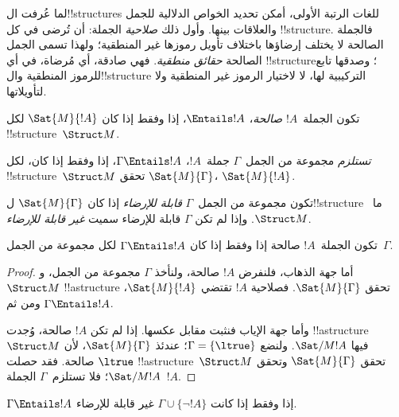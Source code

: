 \documentclass[../../../include/open-logic-section]{subfiles}
\begin{document}

\begin{explain}
لما عُرفت ال!!{structure}s للغات الرتبة الأولى، أمكن تحديد
الخواص الدلالية للجمل والعلاقات بينها. وأول ذلك \emph{صلاحية}
الجملة: أن تُرضى في كل !!{structure}. فالجملة الصالحة لا يختلف
إرضاؤها باختلاف تأويل رموزها غير المنطقية؛ ولهذا تسمى الجمل
الصالحة \emph{حقائق منطقية}. فهي صادقة، أي مُرضاة، في أي
!!{structure}؛ وصدقها تابع للرموز المنطقية وال!!{structure}
التركيبية لها، لا لاختيار الرموز غير المنطقية ولا لتأويلاتها.
\end{explain}

\begin{defn}[الصلاحية]
تكون الجملة~$!A$ \emph{صالحة}، $\Entails !A$، إذا وفقط إذا كان
$\Sat{M}{!A}$ لكل !!{structure}~$\Struct M$.
\end{defn}

\begin{defn}[الاستلزام]
\emph{تستلزم} مجموعة من الجمل~$\Gamma$ جملة~$!A$،
$\Gamma \Entails !A$، إذا وفقط إذا كان، لكل
!!{structure}~$\Struct M$ تحقق $\Sat{M}{\Gamma}$،
$\Sat{M}{!A}$.
\end{defn}


\begin{defn}
تكون مجموعة من الجمل~$\Gamma$ \emph{قابلة للإرضاء} إذا كان
$\Sat{M}{\Gamma}$ ل!!{structure} ما~$\Struct M$. وإذا لم تكن
$\Gamma$ قابلة للإرضاء سميت \emph{غير قابلة للإرضاء}.
\end{defn}

\begin{prop}
تكون الجملة~$!A$ صالحة إذا وفقط إذا كان
$\Gamma \Entails !A$ لكل مجموعة من الجمل~$\Gamma$.
\end{prop}

\begin{proof}
أما جهة الذهاب، فلنفرض $!A$ صالحة، ولنأخذ $\Gamma$ مجموعة من
الجمل، و$\Struct M$ !!a{structure} تحقق
$\Sat{M}{\Gamma}$. فصلاحية $!A$ تقتضي $\Sat{M}{!A}$،
ومن ثم $\Gamma \Entails !A$.

وأما جهة الإياب فنثبت مقابل عكسها. إذا لم تكن $!A$ صالحة، وُجدت
!!a{structure}~$\Struct M$ فيها $\Sat/{M}{!A}$. ولنضع
$\Gamma = \{ \ltrue \}$؛ عندئذ $\Sat{M}{\Gamma}$، لأن
$\ltrue$ صالحة. فقد حصلت !!a{structure}~$\Struct M$ تحقق
$\Sat{M}{\Gamma}$ وتحقق $\Sat/{M}{!A}$؛ فلا تستلزم~$\Gamma$
الجملة~$!A$.
\end{proof}

\begin{prop}
$\Gamma \Entails !A$ إذا وفقط إذا كانت
$\Gamma \cup \{\lnot !A\}$ غير قابلة للإرضاء.
\end{prop}
\end{document}
